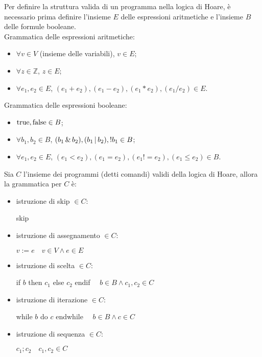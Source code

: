 Per definire la struttura valida di un programma nella logica di Hoare, è necessario prima definire l'insieme $E$ delle espressioni aritmetiche e l'insieme $B$ delle formule booleane.\\
Grammatica delle espressioni aritmetiche:
\begin{itemize}
    \item $\forall v \in V$ (insieme delle variabili), $v \in E$;
    \item $\forall z \in \mathbb{Z}$, $z \in E$;
    \item $\forall e_1, e_2 \in E$, $(e_1+e_2), (e_1-e_2), (e_1*e_2), (e_1/e_2) \in E$.
\end{itemize}
Grammatica delle espressioni booleane:
\begin{itemize}
    \item $\textnormal{true}, \textnormal{false} \in B$;
    \item $\forall b_1, b_2 \in B$, $(b_1 \,\&\, b_2), (b_1 \,|\, b_2), ! b_1 \in B$;
    \item $\forall e_1, e_2 \in E$, $(e_1 < e_2), (e_1 = e_2), (e_1 != e_2), (e_1 \le e_2) \in B$.
\end{itemize}

Sia $C$ l'insieme dei programmi (detti comandi) validi della logica di Hoare, allora la grammatica per $C$ è:
\begin{itemize}
    \item istruzione di skip $\in C$:
    \begin{center}
        skip
    \end{center}
    \item istruzione di assegnamento $\in C$:
    \begin{center}
        $v:=e \quad v \in V \land e \in E$
    \end{center}
    \item istruzione di scelta $\in C$:
    \begin{center}
        if $b$ then $c_1$ else $c_2$ endif $\quad b \in B \land c_1, c_2 \in C$
    \end{center}
    \item istruzione di iterazione $\in C$:
    \begin{center}
        while $b$ do $c$ endwhile $\quad b \in B \land c \in C$
    \end{center}
    \item istruzione di sequenza $\in C$:
    \begin{center}
        $c_1 ; c_2 \quad c_1, c_2 \in C$
    \end{center}
\end{itemize}

